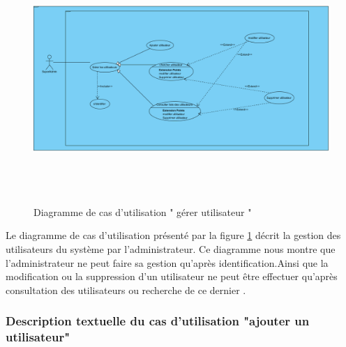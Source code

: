 \documentclass{article}
\begin{document}
\begin{enumerate}
\begin{figure}[H]
\centering
\includegraphics[height=3.7in]{UseCaseDiagram2.png}
\caption[Figure10 : Diagramme de cas d'utilisation " gérer utilisateur "]{Diagramme de cas d'utilisation " gérer utilisateur "}
\label{fig:pic10}
\end{figure}
Le diagramme de cas d'utilisation présenté par la figure \ref{fig:pic10} décrit la gestion des
utilisateurs du système par l'administrateur. Ce diagramme nous montre que l'administrateur ne peut faire sa gestion qu'après identification.Ainsi que la modification ou la
suppression d'un utilisateur ne peut être effectuer qu'après consultation des utilisateurs
ou recherche de ce dernier .
\end{enumerate}
\subsubsection{Description textuelle du cas d'utilisation "ajouter un utilisateur"}
\end{document}
